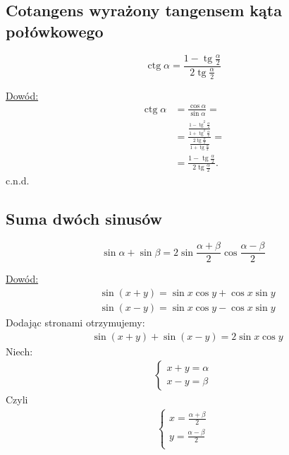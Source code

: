 \documentclass[12pt,a4paper,fleqn]{article}
\DeclareMathOperator{\tg}{tg}
\DeclareMathOperator{\ctg}{ctg}
\begin{document}
	\subsection{Cotangens wyrażony tangensem kąta połówkowego}
		\begin{equation*}
			\ctg\alpha = \frac{1-\tg\frac{\alpha}{2}}{2\tg\frac{\alpha}{2}}
		\end{equation*}
		
		\underline{Dowód:} \noindent
		\begin{align*}
			\ctg\alpha &= \frac{\cos\alpha}{\sin\alpha} = \\
					   &= \frac{\frac{1-\tg^2\frac{\alpha}{2}}{1+\tg^2\frac{\alpha}{2}}}{\frac{2\tg\frac{\alpha}{2}}{1+\tg\frac{\alpha}{2}}} =\\
					   &= \frac{1-\tg\frac{\alpha}{2}}{2\tg\frac{\alpha}{2}}.
		\end{align*}
		c.n.d.
		
	\subsection{Suma dwóch sinusów}
		\begin{equation*}
			\sin\alpha + \sin \beta =2\sin\frac{\alpha+\beta}{2}\cos\frac{\alpha-\beta}{2} 
		\end{equation*}
		
		\underline{Dowód:} \noindent
		\begin{align*}
			&\sin(x+y) = \sin x \cos y + \cos x \sin y\\
			&\sin(x-y) = \sin x \cos y - \cos x \sin y
		\end{align*}
			Dodając stronami otrzymujemy:
		\begin{align*}
			&\sin(x+y) + \sin(x-y) = 2\sin x \cos y
		\end{align*}
		Niech:
		\begin{align*}
		\begin{cases}
			x+y = \alpha\\
			x-y = \beta
		\end{cases}
		\end{align*}
		Czyli
		\begin{align*}
		\begin{cases}
		 	x = \frac{\alpha+\beta}{2}\\
		 	y = \frac{\alpha-\beta}{2}\\
		\end{cases}
		\end{align*}
		
\end{document}
